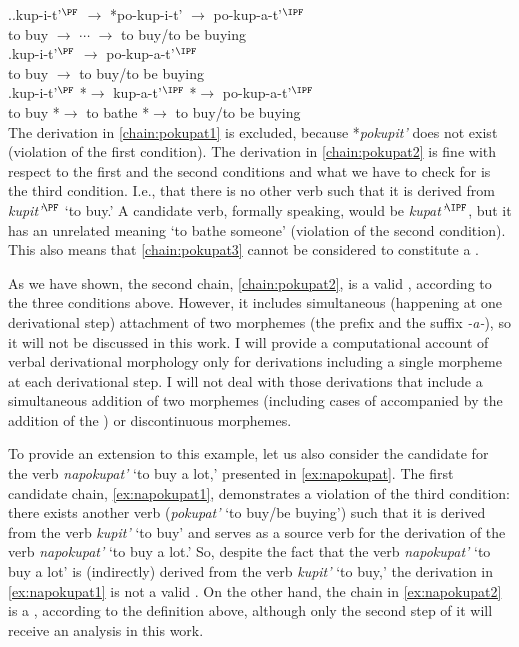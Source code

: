 \ex.\label{chain:pokupat}\ag.\label{chain:pokupat1}kup-i-t'$^\PF$ $\rightarrow$ *po-kup-i-t' $\rightarrow$ po-kup-a-t'$^\IPF$\\	
{to buy} $\rightarrow$ $\cdots$ $\rightarrow$ {to buy/to be buying}\\
\bg.\label{chain:pokupat2}kup-i-t'$^\PF$ $\rightarrow$ po-kup-a-t'$^\IPF$\\
{to buy} $\rightarrow$ {to buy/to be buying}\\
\bg.\label{chain:pokupat3}kup-i-t'$^\PF$ *$\rightarrow$ kup-a-t'$^\IPF$ *$\rightarrow$ po-kup-a-t'$^\IPF$\\
{to buy} *$\rightarrow$ {to bathe} *$\rightarrow$ {to buy/to be buying}\\

The derivation in \ref{chain:pokupat1} is excluded, because *\textit{pokupit'} does not exist (violation of the first condition). The derivation in \ref{chain:pokupat2} is fine with respect to the first and the second conditions and what we have to check for is the third condition. I.e., that there is no other verb such that it is derived from \textit{kupit'}$^\PF$ `to buy.'  A candidate verb, formally speaking, would be \textit{kupat'$^\IPF$}, but it has an unrelated meaning `to bathe someone' (violation of the second condition). This also means that \ref{chain:pokupat3} cannot be considered to constitute a .  

As we have shown, the second chain, \ref{chain:pokupat2}, is a valid , according to the three conditions above. However, it includes simultaneous (happening at one derivational step) attachment of two morphemes (the prefix  and the suffix \textit{-a-}), so it will not be discussed in this work. I will provide a computational account of verbal derivational morphology only for derivations including a single morpheme at each derivational step. I will not deal with those derivations that include a simultaneous addition of two morphemes (including cases of  accompanied by the addition of the ) or discontinuous morphemes.

To provide an extension to this example, let us also consider the candidate  for the verb \textit{napokupat'} `to buy a lot,' presented in \ref{ex:napokupat}. The first candidate chain, \ref{ex:napokupat1}, demonstrates a violation of the third condition: there exists another verb (\textit{pokupat'} `to buy/be buying') such that it is derived from the verb \textit{kupit'} `to buy' and serves as a source verb for the derivation of the verb \textit{napokupat'} `to buy a lot.' So, despite the fact that the verb \textit{napokupat'} `to buy a lot' is (indirectly) derived from the verb \textit{kupit'} `to buy,' the derivation in \ref{ex:napokupat1} is not a valid . On the other hand, the chain in \ref{ex:napokupat2} is a , according to the definition above, although only the second step of it will receive an analysis in this work. 

